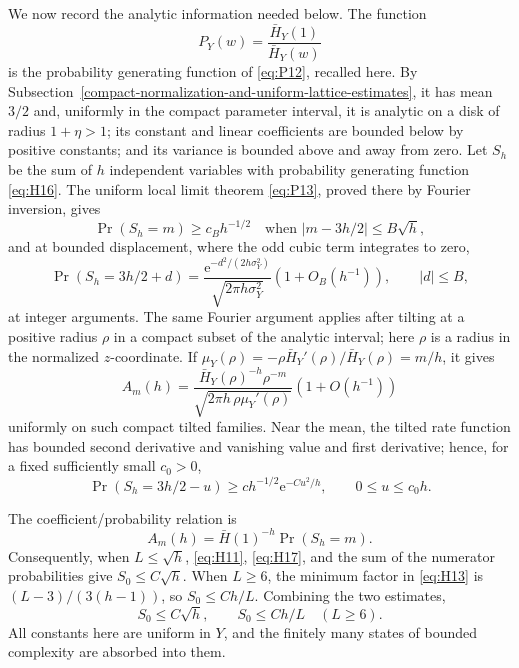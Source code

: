 We now record the analytic information needed below. The function
\begin{equation}
P_Y(w)=\frac{\bar H_Y(1)}{\bar H_Y(w)}
\label{eq:H16}
\end{equation} is the probability generating function of
\eqref{eq:P12}, recalled here. By
Subsection~\ref{compact-normalization-and-uniform-lattice-estimates}, it has
mean \(3/2\) and, uniformly in the compact parameter interval, it is
analytic on a disk of radius \(1+\eta>1\); its constant and linear
coefficients are bounded below by positive constants; and its variance
is bounded above and away from zero. Let \(S_h\) be the sum of \(h\)
independent variables with probability generating function
\eqref{eq:H16}. The uniform local limit theorem \eqref{eq:P13}, proved
there by Fourier inversion, gives \begin{equation}
\Pr(S_h=m)\ge c_Bh^{-1/2}
\quad\text{when }|m-3h/2|\le B\sqrt h,
\label{eq:H17}
\end{equation} and at bounded displacement, where the odd cubic term
integrates to zero, \begin{equation}
\Pr(S_h=3h/2+d)
=\frac{\mathrm{e}^{-d^2/(2h\sigma_Y^2)}}{\sqrt{2\pi h\sigma_Y^2}}
  (1+O_B(h^{-1})),\qquad |d|\le B,
\label{eq:H18}
\end{equation} at integer arguments. The same Fourier argument applies after tilting at a
positive radius \(\rho\) in a compact subset of the analytic interval; here $\rho$ is a radius in the normalized $z$-coordinate. If
\(\mu_Y(\rho)=-\rho\bar H_Y'(\rho)/\bar H_Y(\rho)=m/h\), it gives \begin{equation}
A_m(h)=
\frac{\bar H_Y(\rho)^{-h}\rho^{-m}}{\sqrt{2\pi h\,\rho\mu_Y'(\rho)}}
 (1+O(h^{-1}))
\label{eq:H19}
\end{equation} uniformly on such compact tilted families. Near the mean, the tilted
rate function has bounded second derivative and vanishing value and
first derivative; hence, for a fixed sufficiently small \(c_0>0\), \begin{equation}
\Pr(S_h=3h/2-u)\ge ch^{-1/2}\mathrm{e}^{-Cu^2/h},
\qquad 0\le u\le c_0h.
\label{eq:H20}
\end{equation}

The coefficient/probability relation is \begin{equation}
A_m(h)=\bar H(1)^{-h}\Pr(S_h=m).
\label{eq:H21}
\end{equation} Consequently, when \(L\le\sqrt h\), \eqref{eq:H11}, \eqref{eq:H17}, and the sum of the
numerator probabilities give \(S_0\le C\sqrt h\). When \(L\ge6\), the
minimum factor in \eqref{eq:H13} is \((L-3)/(3(h-1))\), so \(S_0\le Ch/L\).
Combining the two estimates, \begin{equation}
S_0\le C\sqrt h,\qquad S_0\le Ch/L\quad(L\ge6).
\label{eq:H22}
\end{equation} All constants here are uniform in \(Y\), and the finitely many states
of bounded complexity are absorbed into them.
